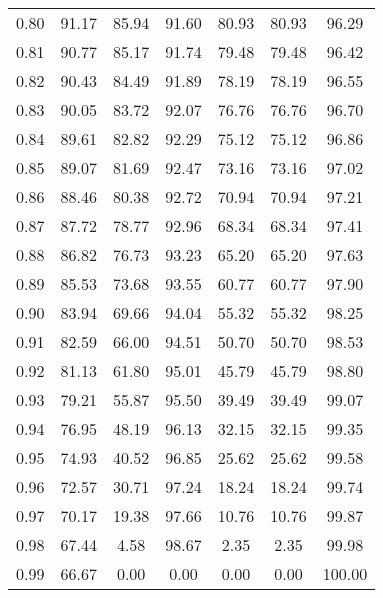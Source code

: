\begin{tabular}{|c|c|c|c|c|c|c|}
      0.80 &     91.17 &     85.94 &      91.60 &   80.93 &      80.93 &         96.29 \\
      0.81 &     90.77 &     85.17 &      91.74 &   79.48 &      79.48 &         96.42 \\
      0.82 &     90.43 &     84.49 &      91.89 &   78.19 &      78.19 &         96.55 \\
      0.83 &     90.05 &     83.72 &      92.07 &   76.76 &      76.76 &         96.70 \\
      0.84 &     89.61 &     82.82 &      92.29 &   75.12 &      75.12 &         96.86 \\
      0.85 &     89.07 &     81.69 &      92.47 &   73.16 &      73.16 &         97.02 \\
      0.86 &     88.46 &     80.38 &      92.72 &   70.94 &      70.94 &         97.21 \\
      0.87 &     87.72 &     78.77 &      92.96 &   68.34 &      68.34 &         97.41 \\
      0.88 &     86.82 &     76.73 &      93.23 &   65.20 &      65.20 &         97.63 \\
      0.89 &     85.53 &     73.68 &      93.55 &   60.77 &      60.77 &         97.90 \\
      0.90 &     83.94 &     69.66 &      94.04 &   55.32 &      55.32 &         98.25 \\
      0.91 &     82.59 &     66.00 &      94.51 &   50.70 &      50.70 &         98.53 \\
      0.92 &     81.13 &     61.80 &      95.01 &   45.79 &      45.79 &         98.80 \\
      0.93 &     79.21 &     55.87 &      95.50 &   39.49 &      39.49 &         99.07 \\
      0.94 &     76.95 &     48.19 &      96.13 &   32.15 &      32.15 &         99.35 \\
      0.95 &     74.93 &     40.52 &      96.85 &   25.62 &      25.62 &         99.58 \\
      0.96 &     72.57 &     30.71 &      97.24 &   18.24 &      18.24 &         99.74 \\
      0.97 &     70.17 &     19.38 &      97.66 &   10.76 &      10.76 &         99.87 \\
      0.98 &     67.44 &      4.58 &      98.67 &    2.35 &       2.35 &         99.98 \\
      0.99 &     66.67 &      0.00 &       0.00 &    0.00 &       0.00 &        100.00 \\
\bottomrule
\end{tabular}

